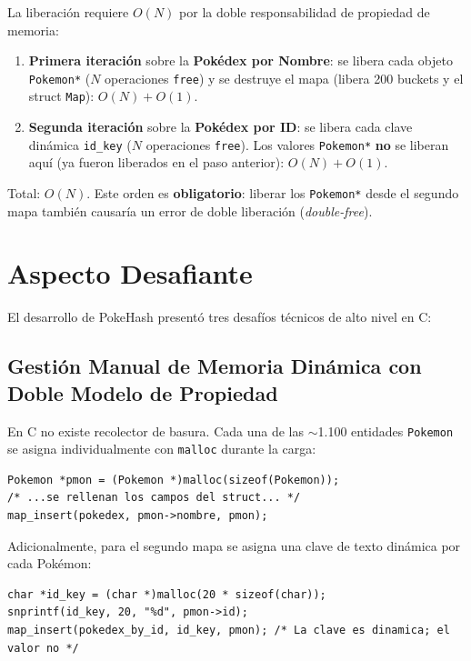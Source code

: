 \documentclass[12pt, letterpaper]{article}
\begin{document}
La liberación requiere $O(N)$ por la doble responsabilidad de propiedad de memoria:
\begin{enumerate}
    \item \textbf{Primera iteración} sobre la \textbf{Pokédex por Nombre}: se libera cada objeto \texttt{Pokemon*} ($N$ operaciones \texttt{free}) y se destruye el mapa (libera 200 buckets y el struct \texttt{Map}): $O(N) + O(1)$.
    \item \textbf{Segunda iteración} sobre la \textbf{Pokédex por ID}: se libera cada clave dinámica \texttt{id\_key} ($N$ operaciones \texttt{free}). Los valores \texttt{Pokemon*} \textbf{no} se liberan aquí (ya fueron liberados en el paso anterior): $O(N) + O(1)$.
\end{enumerate}
Total: $O(N)$. Este orden es \textbf{obligatorio}: liberar los \texttt{Pokemon*} desde el segundo mapa también causaría un error de doble liberación (\emph{double-free}).

\section{Aspecto Desafiante}

El desarrollo de PokeHash presentó tres desafíos técnicos de alto nivel en C:

\subsection{Gestión Manual de Memoria Dinámica con Doble Modelo de Propiedad}

En C no existe recolector de basura. Cada una de las $\sim$1.100 entidades \texttt{Pokemon} se asigna individualmente con \texttt{malloc} durante la carga:

\begin{lstlisting}[caption={Asignación dinámica por Pokémon en \texttt{cargar\_data()}}]
Pokemon *pmon = (Pokemon *)malloc(sizeof(Pokemon));
/* ...se rellenan los campos del struct... */
map_insert(pokedex, pmon->nombre, pmon);
\end{lstlisting}

Adicionalmente, para el segundo mapa se asigna una clave de texto dinámica por cada Pokémon:

\begin{lstlisting}[caption={Asignación dinámica de clave ID para el segundo mapa}]
char *id_key = (char *)malloc(20 * sizeof(char));
snprintf(id_key, 20, "%d", pmon->id);
map_insert(pokedex_by_id, id_key, pmon); /* La clave es dinamica; el valor no */
\end{lstlisting}
\end{document}

